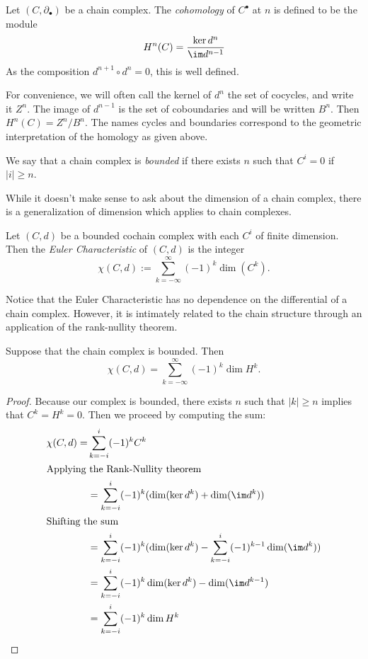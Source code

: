 \begin{definition}
	Let $(C,\partial_\bullet)$ be a chain complex.
	The \emph{cohomology} of $C^\bullet$ at $n$ is defined to be the module 
\[H^n(C)=\frac{\ker d^{n}}{ \im d^{n-1}}\]
 As the composition $d^{n+1}\circ d^n=0$, this is well defined.
 \label{def:homologygroups}
\end{definition}
For convenience, we will often call the kernel of $d^{n}$ the set of cocycles, and write it $Z^n$. The image of $d^{n-1}$ is the set of coboundaries and will be written $B^n$. Then $H^n(C)=Z^n/B^n$. The names cycles and boundaries correspond to the geometric interpretation of the homology as given above.  
\begin{definition} 
	We say that a chain complex is \emph{bounded} if there exists $n$ such that $C^i=0$ if $|i|\geq n$.
\end{definition}
While it doesn't make sense to ask about the dimension of a chain complex, there is a generalization of dimension which applies to chain complexes. 
\begin{definition}
Let $(C, d)$ be a bounded cochain complex  with each $C^i$ of finite dimension.
 Then the \emph{Euler Characteristic} of $(C, d)$ is the integer 
\[\chi(C, d):= \sum_{k=-\infty}^\infty (-1)^k \dim (C^k).\]
\end{definition}
Notice that the Euler Characteristic has no dependence on the differential of a chain complex. However, it is intimately related to the chain structure through an application of the rank-nullity theorem.  
\begin{lemma} Suppose that the chain complex is bounded. Then 
	\[\chi(C, d) =\sum_{k=-\infty}^\infty (-1)^k \dim H^k.\]
\label{lemma:eulercharacteristic}
\end{lemma}
\begin{proof} Because our complex is bounded, there exists $n$ such that $|k|\geq n$ implies that $C^k=H^k=0$.
	Then we proceed by computing the sum:
\begin{align*}
\chi(C, d)=&\sum_{k=-i}^{i}(-1)^k C^k\\
\intertext{Applying the Rank-Nullity theorem}
 &=\sum_{k=-i}^{i}(-1)^k (\dim (\ker d^k )+\dim( \im d^k))\\
 \intertext{Shifting the sum}
 &=\sum_{k=-i}^{i}(-1)^k (\dim(\ker d^k)-\sum_{k=-i}^{i}(-1)^{k-1} \dim( \im d^k))\\
 &=\sum_{k=-i}^{i}(-1)^k \dim( \ker d^k) - \dim (\im d^{k-1})\\&= \sum_{k=-i}^{i}(-1)^k \dim H^k\end{align*}
\end{proof}

